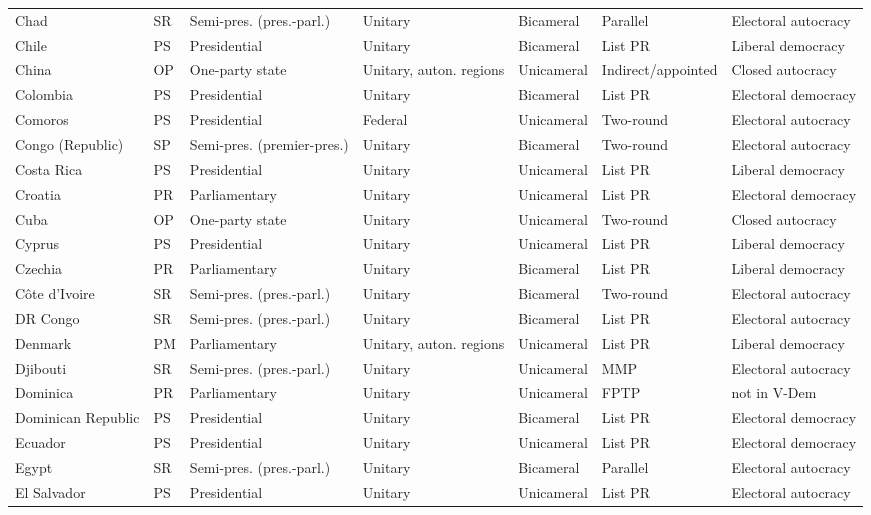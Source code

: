 \documentclass[11pt,a4paper]{article}
\begin{document}
{\begin{longtable}{p{2.9cm}lp{2.9cm}p{2.4cm}lp{1.9cm}p{2.0cm}}
Chad & SR & Semi-pres. (pres.-parl.) & Unitary & Bicameral & Parallel & Electoral autocracy\\
Chile & PS & Presidential & Unitary & Bicameral & List PR & Liberal democracy\\
China & OP & One-party state & Unitary, auton. regions & Unicameral & Indirect/appointed & Closed autocracy\\
Colombia & PS & Presidential & Unitary & Bicameral & List PR & Electoral democracy\\
Comoros & PS & Presidential & Federal & Unicameral & Two-round & Electoral autocracy\\
Congo (Republic) & SP & Semi-pres. (premier-pres.) & Unitary & Bicameral & Two-round & Electoral autocracy\\
Costa Rica & PS & Presidential & Unitary & Unicameral & List PR & Liberal democracy\\
Croatia & PR & Parliamentary & Unitary & Unicameral & List PR & Electoral democracy\\
Cuba & OP & One-party state & Unitary & Unicameral & Two-round & Closed autocracy\\
Cyprus & PS & Presidential & Unitary & Unicameral & List PR & Liberal democracy\\
Czechia & PR & Parliamentary & Unitary & Bicameral & List PR & Liberal democracy\\
Côte d'Ivoire & SR & Semi-pres. (pres.-parl.) & Unitary & Bicameral & Two-round & Electoral autocracy\\
DR Congo & SR & Semi-pres. (pres.-parl.) & Unitary & Bicameral & List PR & Electoral autocracy\\
Denmark & PM & Parliamentary & Unitary, auton. regions & Unicameral & List PR & Liberal democracy\\
Djibouti & SR & Semi-pres. (pres.-parl.) & Unitary & Unicameral & MMP & Electoral autocracy\\
Dominica & PR & Parliamentary & Unitary & Unicameral & FPTP & not in V-Dem\\
Dominican Republic & PS & Presidential & Unitary & Bicameral & List PR & Electoral democracy\\
Ecuador & PS & Presidential & Unitary & Unicameral & List PR & Electoral democracy\\
Egypt & SR & Semi-pres. (pres.-parl.) & Unitary & Bicameral & Parallel & Electoral autocracy\\
El Salvador & PS & Presidential & Unitary & Unicameral & List PR & Electoral autocracy\\

\end{longtable}}
\end{document}
